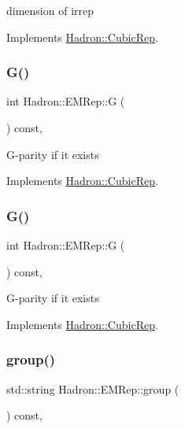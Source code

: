 dimension of irrep 

Implements \mbox{\hyperlink{structHadron_1_1CubicRep_ac178d14064f037a66af4b9fb4b312d51}{Hadron\+::\+Cubic\+Rep}}.

\mbox{\label{structHadron_1_1EMRep_a7db588926f9f4b10f810a5d0d1980bdf}} 
\subsubsection{\texorpdfstring{G()}{G()}\hspace{0.1cm}{\footnotesize\ttfamily [1/2]}}
{\footnotesize\ttfamily int Hadron\+::\+E\+M\+Rep\+::G (\begin{DoxyParamCaption}{ }\end{DoxyParamCaption}) const\hspace{0.3cm}{\ttfamily [inline]}, {\ttfamily [virtual]}}

G-\/parity if it exists 

Implements \mbox{\hyperlink{structHadron_1_1CubicRep_a52104e43266d1614c00bbd1c3b395458}{Hadron\+::\+Cubic\+Rep}}.

\mbox{\label{structHadron_1_1EMRep_a7db588926f9f4b10f810a5d0d1980bdf}} 
\subsubsection{\texorpdfstring{G()}{G()}\hspace{0.1cm}{\footnotesize\ttfamily [2/2]}}
{\footnotesize\ttfamily int Hadron\+::\+E\+M\+Rep\+::G (\begin{DoxyParamCaption}{ }\end{DoxyParamCaption}) const\hspace{0.3cm}{\ttfamily [inline]}, {\ttfamily [virtual]}}

G-\/parity if it exists 

Implements \mbox{\hyperlink{structHadron_1_1CubicRep_a52104e43266d1614c00bbd1c3b395458}{Hadron\+::\+Cubic\+Rep}}.

\mbox{\label{structHadron_1_1EMRep_aa1ca6e0e98d03340cb05616f1ea52f79}} 
\subsubsection{\texorpdfstring{group()}{group()}\hspace{0.1cm}{\footnotesize\ttfamily [1/2]}}
{\footnotesize\ttfamily std\+::string Hadron\+::\+E\+M\+Rep\+::group (\begin{DoxyParamCaption}{ }\end{DoxyParamCaption}) const\hspace{0.3cm}{\ttfamily [inline]}, {\ttfamily [virtual]}}

